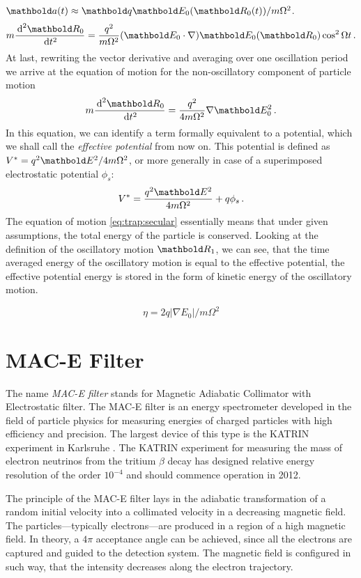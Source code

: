 $\mb a(t) \approx \mb q\mb E_0(\mb R_0(t))/m\Omega^2$.
\begin{equation}
m\frac{\de^2\mb R_0}{\de t^2} =
\frac{q^2}{m\Omega^2}(\mb E_0\cdot\nabla)\mb E_0(\mb R_0)\cos^2\Omega t\,.
\end{equation}
At last, rewriting the vector derivative and averaging over one
oscillation period we arrive at the equation of motion for the
non-oscillatory component of particle motion
\begin{equation}
m\frac{\de^2\mb R_0}{\de t^2} =
\frac{q^2}{4m\Omega^2}\nabla\mb E_0^2\,.
\label{eq:trap:secular}
\end{equation}
In this equation, we can identify a term formally equivalent
to a potential, which we shall call the {\em effective potential}
from now on. This potential is defined as
$V^* = {q^2\mb E^2}/{4m\Omega^2}$,
or more generally in case of a superimposed electrostatic potential
$\phi_s$:
\begin{equation}
V^* = \frac{q^2\mb E^2}{4m\Omega^2} + q\phi_s\,.
\end{equation}
The equation of motion \eqref{eq:trap:secular} essentially means
that under given assumptions, the total energy of the particle
is conserved. Looking at the definition of the oscillatory
motion $\mb R_1$, we can see, that the time averaged energy
of the oscillatory motion is equal to the effective potential, \ie
the effective potential energy is stored in the form of kinetic
energy of the oscillatory motion.

\begin{equation}
\eta = 2q|\nabla E_0|/m\Omega^2
\label{eq:trap:adiab}
\end{equation}

\section{MAC-E Filter}
The name {\em MAC-E filter} stands for Magnetic Adiabatic Collimator with
Electrostatic filter. The MAC-E filter is an energy spectrometer
developed in the field of particle physics \citep{beamson1980} 
for measuring energies of charged particles
with high efficiency and precision. The largest device of this type is the
KATRIN experiment in Karlsruhe \citep{katrin,weinheimer2002}. The KATRIN
experiment for measuring the mass of electron neutrinos from the
tritium $\beta$ decay has designed relative energy resolution of the order
$10^{-4}$ and should commence operation in 2012.

The principle of the MAC-E filter lays in the adiabatic transformation
of a random initial velocity into a collimated velocity in a decreasing
magnetic field. The particles---typically
electrons---are produced in a region of a high magnetic field. In theory,
a $4\pi$ acceptance angle can be achieved, since all the electrons
are captured and guided to the detection system. 
The magnetic field is configured in such way, that the intensity decreases
along the electron trajectory.

